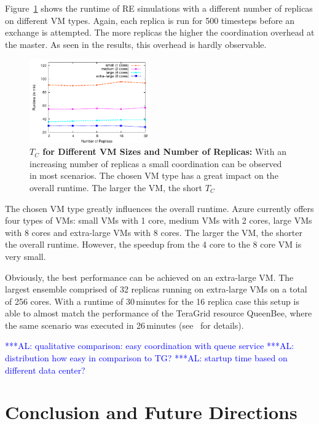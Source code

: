\documentclass[conference,final]{IEEEtran}
\newcommand{\tc}{$T_{C}$ }
\newcommand{\alnote}[1]{ {\textcolor{blue} { ***AL: #1 }}}
\newcommand{\alnote}[1]{}
\begin{document}
Figure~\ref{fig:performance_repex_scaleout_vmsizes} shows the runtime of RE simulations
with a different number of replicas on different VM types. Again, each replica
is run for 500 timesteps before an exchange is attempted. The more replicas the higher the 
coordination overhead at the master. As seen in the results, this overhead is hardly 
observable.
\begin{figure}[ht]
    \centering
        \includegraphics[width=0.46\textwidth]{performance/repex-azure.pdf}
    \caption{\textbf{\tc for Different VM Sizes and Number of Replicas:} With
    an increasing number of replicas a small coordination can be observed in most 
    scenarios. The chosen VM type has a great impact on the overall runtime. The larger
    the VM, the short \tc}
    \label{fig:performance_repex_scaleout_vmsizes}
\end{figure}

The chosen VM type greatly influences the overall runtime. Azure currently offers four
types of VMs: small VMs with 1 core, medium VMs with 2 cores, large VMs with 8 cores
and extra-large VMs with 8 cores. The larger the VM, the shorter the overall runtime.
However, the speedup from the 4 core to the 8 core VM is very small. 

Obviously, the best performance can be achieved on an extra-large VM. The largest ensemble 
comprised of 32 replicas running on extra-large VMs on a total of 256 cores.
With a runtime of 30\,minutes for the 16 replica case this setup is able to almost 
match the performance of the TeraGrid resource QueenBee, where the same scenario 
was executed in 26\,minutes  (see~\cite{Luckow:2008fp} for details).


\alnote{qualitative comparison: easy coordination with queue service}
\alnote{distribution how easy in comparison to TG?}
\alnote{startup time based on different data center?}
\section{Conclusion and Future Directions}
\end{document}
